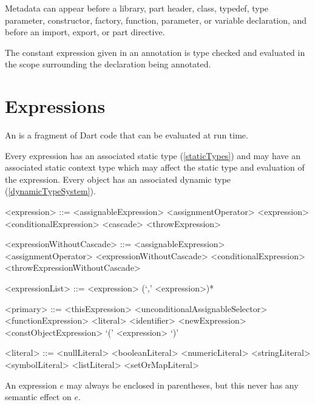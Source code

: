 \documentclass[makeidx]{article}
\begin{document}
{\LMHash{}%
Metadata can appear before a library, part header, class,
typedef, type parameter, constructor, factory, function,
parameter, or variable declaration,
and before an import, export, or part directive.

\LMHash{}%
The constant expression given in an annotation is type checked and evaluated
in the scope surrounding the declaration being annotated.


\section{Expressions}

\LMHash{}%
An  is a fragment of Dart code
that can be evaluated at run time.

\LMHash{}%
Every expression has an associated static type (\ref{staticTypes}) and
may have an associated static context type
which may affect the static type and evaluation of the expression.
Every object has an associated dynamic type (\ref{dynamicTypeSystem}).

\begin{grammar}
<expression> ::= <assignableExpression> <assignmentOperator> <expression>
  \alt <conditionalExpression>
  \alt <cascade>
  \alt <throwExpression>

<expressionWithoutCascade> ::= \gnewline{}
  <assignableExpression> <assignmentOperator> <expressionWithoutCascade>
  \alt <conditionalExpression>
  \alt <throwExpressionWithoutCascade>

<expressionList> ::= <expression> (`,' <expression>)*

<primary> ::= <thisExpression>
  \alt \SUPER{} <unconditionalAssignableSelector>
  \alt <functionExpression>
  \alt <literal>
  \alt <identifier>
  \alt <newExpression>
  \alt <constObjectExpression>
  \alt `(' <expression> `)'

<literal> ::= <nullLiteral>
  \alt <booleanLiteral>
  \alt <numericLiteral>
  \alt <stringLiteral>
  \alt <symbolLiteral>
  \alt <listLiteral>
  \alt <setOrMapLiteral>
\end{grammar}

\LMHash{}%
An expression $e$ may always be enclosed in parentheses, but this never has any semantic effect on $e$.

}
\end{document}
